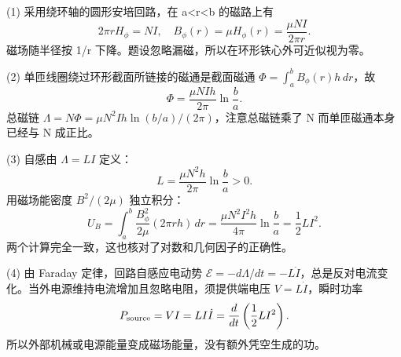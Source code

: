 (1) 采用绕环轴的圆形安培回路，在 a<r<b 的磁路上有
\[
2\pi r H_\phi=NI,\quad
B_\phi(r)=\mu H_\phi(r)=\frac{\mu NI}{2\pi r}.
\]
磁场随半径按 1/r 下降。题设忽略漏磁，所以在环形铁心外可近似视为零。

(2) 单匝线圈绕过环形截面所链接的磁通是截面磁通 \(\Phi=\int_a^bB_\phi(r)h\,dr\)，故
\[
\Phi=\frac{\mu NIh}{2\pi}\ln\frac ba.
\]
总磁链 \(\Lambda=N\Phi=\mu N^2Ih\ln(b/a)/(2\pi)\)，注意总磁链乘了 N 而单匝磁通本身已经与 N 成正比。

(3) 自感由 \(\Lambda=LI\) 定义：
\[
L=\frac{\mu N^2h}{2\pi}\ln\frac ba>0.
\]
用磁场能密度 \(B^2/(2\mu)\) 独立积分：
\[
U_B=\int_a^b\frac{B_\phi^2}{2\mu}(2\pi r h)\,dr
=\frac{\mu N^2I^2h}{4\pi}\ln\frac ba=\frac12LI^2.
\]
两个计算完全一致，这也核对了对数和几何因子的正确性。

(4) 由 Faraday 定律，回路自感应电动势 \(\mathcal E=-d\Lambda/dt=-L\dot I\)，总是反对电流变化。当外电源维持电流增加且忽略电阻，须提供端电压 \(V=L\dot I\)，瞬时功率
\[
P_{\rm source}=VI=LI\dot I=\frac d{dt}\left(\frac12LI^2\right).
\]
所以外部机械或电源能量变成磁场能量，没有额外凭空生成的功。
